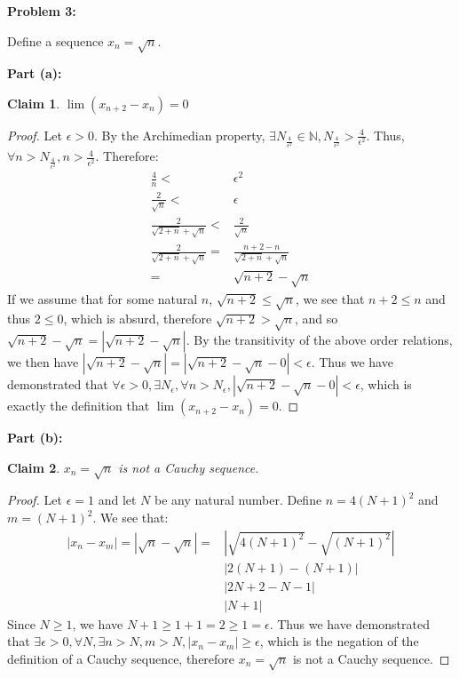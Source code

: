 \documentclass{article}
\newcommand{\nats}{\ensuremath{\mathbb{N}}}
\newcommand{\eps}{\ensuremath{\epsilon}}
\newtheorem{clm}{Claim}
\begin{document}
\textbf{Problem 3:}

Define a sequence $x_n = \sqrt{n}$.

\medskip
\textbf{Part (a):}

\begin{clm}
	$\lim(x_{n+2} - x_n) = 0$
\end{clm}

\begin{proof}
	Let $\eps > 0$.
	By the Archimedian property,
	$\exists N_{\frac{4}{\eps^2}} \in \nats, N_{\frac{4}{\eps^2}} > \frac{4}{\eps^2}$.
	Thus, $\forall n > N_{\frac{4}{\eps^2}}, n > \frac{4}{\eps^2}$.
	Therefore:
	\begin{align}
		\frac{4}{n} < & \eps^2 \\
		\frac{2}{\sqrt{n}} < & \eps \\
		\frac{2}{\sqrt{2 + n} + \sqrt{n}} < & \frac{2}{\sqrt{n}} \\
		\frac{2}{\sqrt{2 + n} + \sqrt{n}} = & \frac{n + 2 - n}{\sqrt{2 + n} + \sqrt{n}}  \\
		= & \sqrt{n + 2} - \sqrt{n}
	\end{align}
	If we assume that for some natural $n$,
	$\sqrt{n + 2} \le \sqrt{n}$,
	we see that $n + 2 \le n$ and thus $2 \le 0$,
	which is absurd,
	therefore $\sqrt{n + 2} > \sqrt{n}$,
	and so $\sqrt{n + 2} - \sqrt{n} = |\sqrt{n + 2} - \sqrt{n}|$.
	By the transitivity of the above order relations,
	we then have $|\sqrt{n + 2} - \sqrt{n}| = 
	|\sqrt{n + 2} - \sqrt{n} - 0| < \eps$.
	Thus we have demonstrated
	that $\forall \eps > 0,
	\exists N_\eps,
	\forall n > N_\eps,
	|\sqrt{n + 2} - \sqrt{n} - 0| < \eps$,
	which is exactly the definition that
	$\lim(x_{n+2} - x_n) = 0$.
\end{proof}

\textbf{Part (b):}

\begin{clm}
	$x_n = \sqrt{n}$ is not a Cauchy sequence.
\end{clm}

\begin{proof}
	Let $\eps = 1$ and let $N$ be any natural number.
	Define $n = 4(N + 1)^2$ and $m = (N + 1)^2$.
	We see that:
	\begin{align}
		|x_n - x_m| = | \sqrt{n} - \sqrt{n}| = 	 &|\sqrt{4(N + 1)^2} - \sqrt{(N + 1)^2}| \\
							 & | 2(N + 1) - (N + 1)| \\
							 & | 2N + 2 - N - 1 | \\
							 & | N + 1 |
	\end{align}
	Since $N \geq 1$, we have $N + 1 \geq 1 + 1 = 2 \geq 1 = \eps$.
	Thus we have demonstrated that
	$\exists \eps > 0, \forall N, \exists n > N, m > N, |x_n - x_m| \geq \eps$,
	which is the negation of the definition of a Cauchy sequence,
	therefore $x_n = \sqrt{n}$ is not a Cauchy sequence.
\end{proof}
\end{document}
